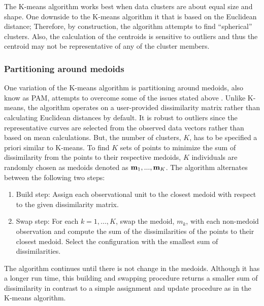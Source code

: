 The K-means algorithm works best when data clusters are about equal size and shape. One downside to the K-means algorithm it that is based on the Euclidean distance; Therefore, by construction, the algorithm attempts to find ``spherical'' clusters. Also, the calculation of the centroids is sensitive to outliers and thus the centroid may not be representative of any of the cluster members.

 \subsubsection{Partitioning around medoids}
 One variation of the K-means algorithm is partitioning around medoids, also know as PAM, attempts to overcome some of the issues stated above \cite{kaufman1990}.  Unlike K-means, the algorithm operates on a user-provided dissimilarity matrix rather than calculating Euclidean distances by default. It is robust to outliers since the representative curves are selected from the observed data vectors rather than based on mean calculations. But, the number of clusters, $K$, has to be specified a priori similar to K-means. To find $K$ sets of points to minimize the sum of dissimilarity from the points to their respective medoids, $K$ individuals are randomly chosen as medoids denoted as $\mathbf m_{1},...,\mathbf m_{K}$. The algorithm alternates between the following two steps:
 \begin{enumerate}
\item Build step: Assign each observational unit to the closest medoid with respect to the given dissimilarity matrix.
\item Swap step: For each $k=1,...,K$, swap the medoid, $m_{k}$, with each non-medoid observation and compute the sum of the dissimilarities of the points to their closest medoid. Select the configuration with the smallest sum of dissimilarities.
\end{enumerate}
The algorithm continues until there is not change in the medoids. Although it has a longer run time, this building and swapping procedure returns a smaller sum of dissimilarity in contrast to a simple assignment and update procedure as in the K-means algorithm. 

